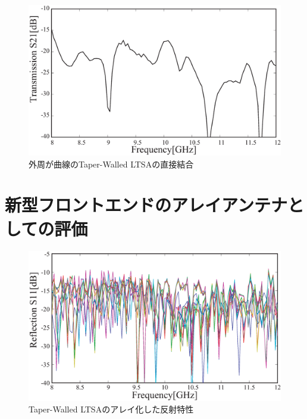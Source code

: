 ﻿\documentclass[12pt,oneside]{jsbook}
\begin{document}
\begin{figure}[t]
\begin{center}
\includegraphics[width =\hsize]{new_solo_S21_dc.eps}
\caption{外周が曲線のTaper-Walled LTSAの直接結合}
\label{new-solo-S21}
\end{center}
\end{figure}

\section{新型フロントエンドのアレイアンテナとしての評価}
\begin{figure}[t]
\begin{center}
\includegraphics[width =\hsize]{old_S11.eps}
\caption{Taper-Walled LTSAのアレイ化した反射特性} \label{pic:twltsa-1} 
\end{center}
\end{figure}
\end{document}
